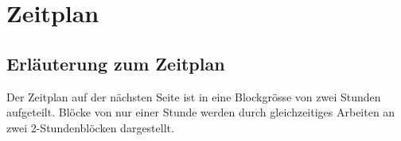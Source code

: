 \chapter{Zeitplan}


\section{Erläuterung zum Zeitplan}
Der Zeitplan auf der nächsten Seite ist in eine Blockgrösse von zwei Stunden aufgeteilt. Blöcke von nur einer Stunde werden durch gleichzeitiges Arbeiten an zwei 2-Stundenblöcken dargestellt.


\newcommand{\soll}[3]{\ganttbar{#1}{#2}{#3}}
\newcommand{\ist}[2]{\ganttbar[bar top shift=-0.01,bar/.append style={bottom color=puzzleblue}]{}{#1}{#2}}

